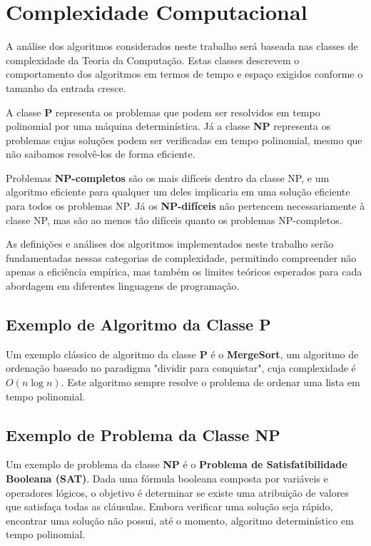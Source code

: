 \documentclass[12pt,oneside,a4paper]{report}
\begin{document}
\section{Complexidade Computacional}

A análise dos algoritmos considerados neste trabalho será baseada nas classes de complexidade da Teoria da Computação. Estas classes descrevem o comportamento dos algoritmos em termos de tempo e espaço exigidos conforme o tamanho da entrada cresce.

A classe \textbf{P} representa os problemas que podem ser resolvidos em tempo polinomial por uma máquina determinística. Já a classe \textbf{NP} representa os problemas cujas soluções podem ser verificadas em tempo polinomial, mesmo que não saibamos resolvê-los de forma eficiente.

Problemas \textbf{NP-completos} são os mais difíceis dentro da classe NP, e um algoritmo eficiente para qualquer um deles implicaria em uma solução eficiente para todos os problemas NP. Já os \textbf{NP-difíceis} não pertencem necessariamente à classe NP, mas são ao menos tão difíceis quanto os problemas NP-completos.

As definições e análises dos algoritmos implementados neste trabalho serão fundamentadas nessas categorias de complexidade, permitindo compreender não apenas a eficiência empírica, mas também os limites teóricos esperados para cada abordagem em diferentes linguagens de programação.

\subsection{Exemplo de Algoritmo da Classe P}

Um exemplo clássico de algoritmo da classe \textbf{P} é o \textbf{MergeSort}, um algoritmo de ordenação baseado no paradigma "dividir para conquistar", cuja complexidade é \( O(n \log n) \). Este algoritmo sempre resolve o problema de ordenar uma lista em tempo polinomial.

\subsection{Exemplo de Problema da Classe NP}

Um exemplo de problema da classe \textbf{NP} é o \textbf{Problema de Satisfatibilidade Booleana (SAT)}. Dada uma fórmula booleana composta por variáveis e operadores lógicos, o objetivo é determinar se existe uma atribuição de valores que satisfaça todas as cláusulas. Embora verificar uma solução seja rápido, encontrar uma solução não possui, até o momento, algoritmo determinístico em tempo polinomial.
\end{document}
